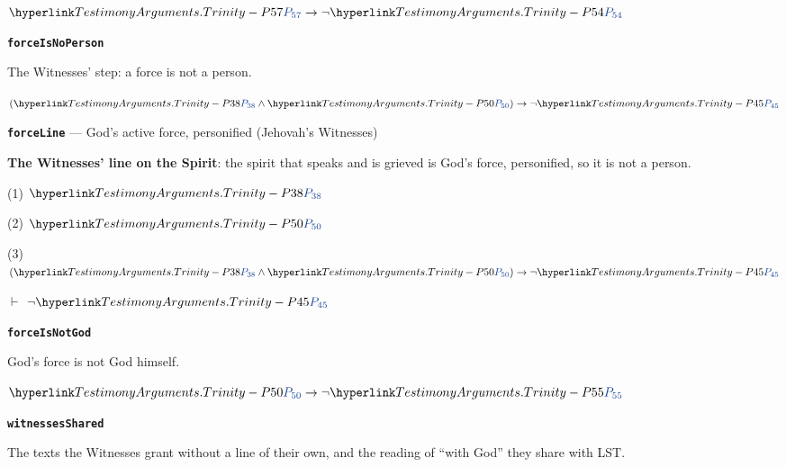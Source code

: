 \documentclass[11pt,paper=\testimonypaper,DIV=13,parskip=false]{scrartcl}
\begin{document}
\begin{derivation}
  \item[] \(\pvar{TestimonyArguments.Trinity}{57} \rightarrow \lnot \pvar{TestimonyArguments.Trinity}{54}\)
\end{derivation}
\par\medskip\noindent\textbf{\texttt{force\allowbreak{}Is\allowbreak{}No\allowbreak{}Person}}\par\nobreak\noindent
The Witnesses’ step: a force is not a person.

\begin{derivation}
  \item[] \((\pvar{TestimonyArguments.Trinity}{38} \land \pvar{TestimonyArguments.Trinity}{50}) \rightarrow \lnot \pvar{TestimonyArguments.Trinity}{45}\)
\end{derivation}
\par\medskip\noindent\textbf{\texttt{force\allowbreak{}Line}} --- God’s active force, personified (Jehovah’s Witnesses)\par\nobreak\noindent
\textbf{The Witnesses’ line on the Spirit}: the spirit that speaks and is grieved is God’s force, personified, so it is not a person.

\begin{derivation}
  \item[(1)] \(\pvar{TestimonyArguments.Trinity}{38}\)
  \item[(2)] \(\pvar{TestimonyArguments.Trinity}{50}\)
  \item[(3)] \((\pvar{TestimonyArguments.Trinity}{38} \land \pvar{TestimonyArguments.Trinity}{50}) \rightarrow \lnot \pvar{TestimonyArguments.Trinity}{45}\)
  \item[\(\vdash\)] \(\lnot \pvar{TestimonyArguments.Trinity}{45}\)
\end{derivation}
\par\medskip\noindent\textbf{\texttt{force\allowbreak{}Is\allowbreak{}Not\allowbreak{}God}}\par\nobreak\noindent
God’s force is not God himself.

\begin{derivation}
  \item[] \(\pvar{TestimonyArguments.Trinity}{50} \rightarrow \lnot \pvar{TestimonyArguments.Trinity}{55}\)
\end{derivation}
\par\medskip\noindent\textbf{\texttt{witnesses\allowbreak{}Shared}}\par\nobreak\noindent
The texts the Witnesses grant without a line of their own, and the reading of “with God” they share with LST.
\end{document}
